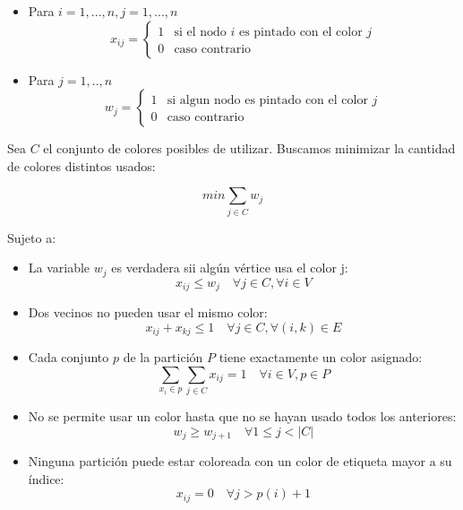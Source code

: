 \documentclass[a4paper]{article}
\begin{document}
\begin{itemize}
	\item Para $i = 1,...,n, j = 1,...,n$	
	\begin{equation*}
	x_{ij} = \begin{cases}
				1 & \mbox{si el nodo }i\mbox{ es pintado con el color }j\\
				0 & \mbox{caso contrario}
			\end{cases}
	\end{equation*}
	
	\item Para $j = 1,..,n$
	\begin{equation*}
	w_j = \begin{cases}
			1 & \mbox{si algun nodo es pintado con el color }j\\
			0 & \mbox{caso contrario}
		\end{cases}
	\end{equation*}
\end{itemize}

Sea $C$ el conjunto de colores posibles de utilizar.  Buscamos minimizar la cantidad de colores distintos usados:

\begin{equation*}
min \sum_{j\in C} w_j
\end{equation*}

Sujeto a:

\begin{itemize}
	\item La variable $w_j$ es verdadera sii algún vértice usa el color j:
	\begin{equation*}
	x_{ij} \leq w_j \quad \forall j \in C, \forall i \in V
	\end{equation*}
	
	\item Dos vecinos no pueden usar el mismo color:
	\begin{equation*}
	x_{ij}+x_{kj} \leq 1 \quad \forall j \in C, \forall (i,k) \in E
	\end{equation*}
	
	\item Cada conjunto $p$ de la partición $P$ tiene exactamente un color asignado:
	\begin{equation*}
	\sum_{x_i \in p} \sum_{j \in C} x_{ij} = 1 \quad \forall i \in V, p \in P
	\end{equation*}
	
	\item No se permite usar un color hasta que no se hayan usado todos los anteriores:
	\begin{equation*}
	w_j \geq w_{j+1} \quad \forall 1 \leq j < |C|
	\end{equation*}
	
	\item Ninguna partición puede estar coloreada con un color de etiqueta mayor a su índice:
	\begin{equation*}
	x_{ij} = 0 \quad \forall j > p(i)+1
	\end{equation*}
\end{itemize}
\end{document}
